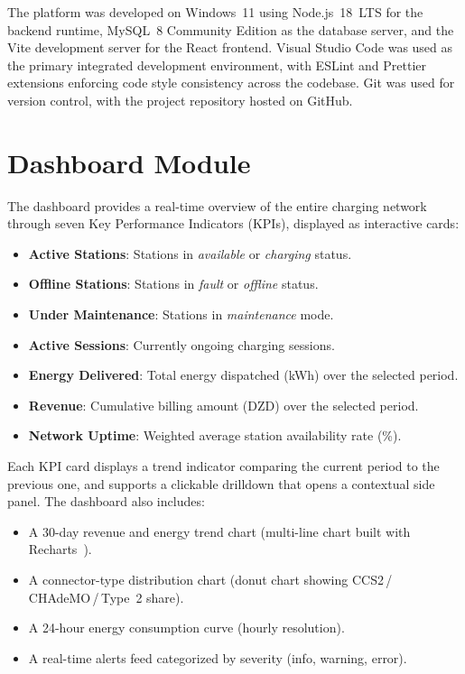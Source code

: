\documentclass[12pt,a4paper]{report}
\begin{document}
The platform was developed on Windows~11 using Node.js~18~LTS for the backend runtime,
MySQL~8 Community Edition as the database server, and the Vite development server for the
React frontend. Visual Studio Code was used as the primary integrated development environment,
with ESLint and Prettier extensions enforcing code style consistency across the codebase. Git
was used for version control, with the project repository hosted on GitHub.

\section{Dashboard Module}

The dashboard provides a real-time overview of the entire charging network through seven Key
Performance Indicators (KPIs), displayed as interactive cards:

\begin{itemize}
  \item \textbf{Active Stations}: Stations in \textit{available} or \textit{charging} status.
  \item \textbf{Offline Stations}: Stations in \textit{fault} or \textit{offline} status.
  \item \textbf{Under Maintenance}: Stations in \textit{maintenance} mode.
  \item \textbf{Active Sessions}: Currently ongoing charging sessions.
  \item \textbf{Energy Delivered}: Total energy dispatched (kWh) over the selected period.
  \item \textbf{Revenue}: Cumulative billing amount (DZD) over the selected period.
  \item \textbf{Network Uptime}: Weighted average station availability rate (\%).
\end{itemize}

Each KPI card displays a trend indicator comparing the current period to the previous one, and
supports a clickable drilldown that opens a contextual side panel. The dashboard also includes:

\begin{itemize}
  \item A 30-day revenue and energy trend chart (multi-line chart built with
        Recharts~\autocite{recharts_docs}).
  \item A connector-type distribution chart (donut chart showing CCS2\,/\,CHAdeMO\,/\,Type~2
        share).
  \item A 24-hour energy consumption curve (hourly resolution).
  \item A real-time alerts feed categorized by severity (info, warning, error).
\end{itemize}
\end{document}
